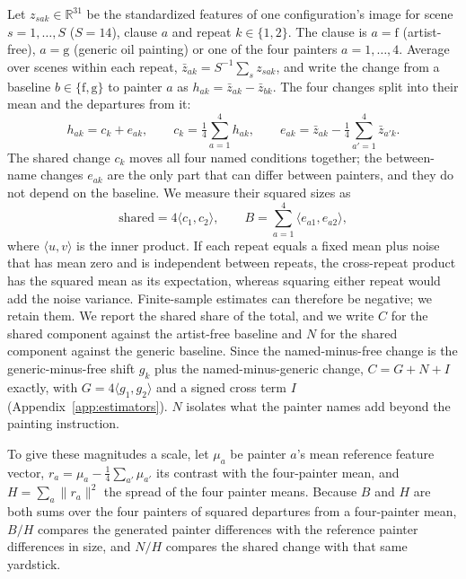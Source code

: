 \documentclass[10pt]{article}
\newcommand{\R}{\mathbb{R}}
\newcommand{\ip}[2]{\langle #1,#2\rangle}
\begin{document}
Let $z_{sak}\in\R^{31}$ be the standardized features of one configuration's image
for scene $s=1,\dots,S$ ($S=14$), clause $a$ and repeat $k\in\{1,2\}$. The clause
is $a=\mathrm{f}$ (artist-free), $a=\mathrm{g}$ (generic oil painting) or one of the
four painters $a=1,\dots,4$. Average over scenes within each repeat,
$\bar z_{ak}=S^{-1}\sum_s z_{sak}$, and write the change from a baseline
$b\in\{\mathrm{f},\mathrm{g}\}$ to painter $a$ as $h_{ak}=\bar z_{ak}-\bar z_{bk}$.
The four changes split into their mean and the departures from it:
\begin{equation}
h_{ak}=c_k+e_{ak},\qquad c_k=\tfrac14\sum_{a=1}^4 h_{ak},\qquad
e_{ak}=\bar z_{ak}-\tfrac14\sum_{a'=1}^4\bar z_{a'k}.
\label{eq:split}
\end{equation}
The shared change $c_k$ moves all four named conditions together; the between-name
changes $e_{ak}$ are the only part that can differ between painters, and they do
not depend on the baseline. We measure their squared sizes as
\begin{equation}
\text{shared}=4\ip{c_1}{c_2},\qquad
B=\sum_{a=1}^4\ip{e_{a1}}{e_{a2}},
\label{eq:components}
\end{equation}
where $\ip{u}{v}$ is the inner product. If each repeat equals a fixed mean plus
noise that has mean zero and is independent between repeats, the cross-repeat
product has the squared mean as its expectation, whereas squaring either repeat
would add the noise variance. Finite-sample estimates can therefore be negative;
we retain them. We report the shared share of the total, and we write $C$ for the
shared component against the artist-free baseline and $N$ for the shared component
against the generic baseline. Since the named-minus-free change is the
generic-minus-free shift $g_k$ plus the named-minus-generic change,
$C=G+N+I$ exactly, with $G=4\ip{g_1}{g_2}$ and a signed cross term
$I$ (Appendix~\ref{app:estimators}). $N$ isolates what the painter names add beyond
the painting instruction.

To give these magnitudes a scale, let $\mu_a$ be painter $a$'s mean reference
feature vector, $r_a=\mu_a-\frac14\sum_{a'}\mu_{a'}$ its contrast with the
four-painter mean, and $H=\sum_a\|r_a\|^2$ the spread of the four painter means.
Because $B$ and $H$ are both sums over the four painters of squared departures from
a four-painter mean, $B/H$ compares the generated painter differences with the
reference painter differences in size, and $N/H$ compares the shared change with
that same yardstick.
\end{document}
